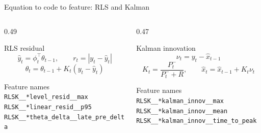 \documentclass[10pt,aspectratio=169]{beamer}
\newcommand{\code}[1]{\texttt{\footnotesize #1}}
\begin{document}
\begin{frame}{Equation to code to feature: RLS and Kalman}
\small
\begin{columns}[T,totalwidth=\textwidth]
\begin{column}{0.49\textwidth}
\begin{block}{RLS residual}
\[
\hat{y}_t=\phi_t^\top\theta_{t-1},\qquad
r_t=|y_t-\hat{y}_t|
\]
\[
\theta_t=\theta_{t-1}+K_t(y_t-\hat{y}_t)
\]
\end{block}
\begin{exampleblock}{Feature names}
\code{RLSK\_\_*level\_resid\_\_max}\\
\code{RLSK\_\_*linear\_resid\_\_p95}\\
\code{RLSK\_\_*theta\_delta\_\_late\_pre\_delta}
\end{exampleblock}
\end{column}
\begin{column}{0.47\textwidth}
\begin{alertblock}{Kalman innovation}
\[
\nu_t=y_t-\hat{x}_{t-1}
\]
\[
K_t=\frac{P_t^-}{P_t^-+R},\qquad
\hat{x}_t=\hat{x}_{t-1}+K_t\nu_t
\]
\end{alertblock}
\begin{exampleblock}{Feature names}
\code{RLSK\_\_*kalman\_innov\_\_max}\\
\code{RLSK\_\_*kalman\_innov\_\_mean}\\
\code{RLSK\_\_*kalman\_innov\_\_time\_to\_peak}
\end{exampleblock}
\end{column}
\end{columns}
\vspace{2mm}
\centering
{}
\end{frame}
\end{document}
